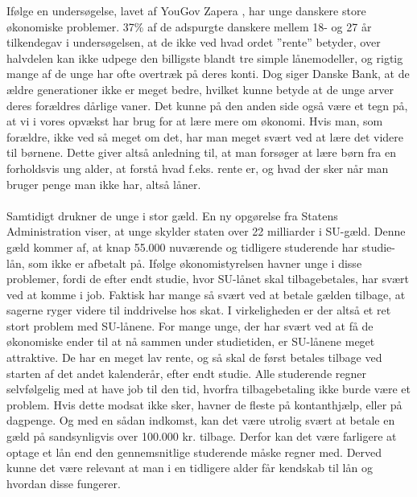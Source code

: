  Ifølge en undersøgelse, lavet af YouGov Zapera \cite{DanskeB1}, har unge danskere store økonomiske problemer. 37\% af de adspurgte danskere mellem 18- og 27 år tilkendegav i undersøgelsen, at de ikke ved hvad ordet ”rente” betyder, over halvdelen kan ikke udpege den billigste blandt tre simple lånemodeller, og rigtig mange af de unge har ofte overtræk på deres konti. Dog siger Danske Bank, at de ældre generationer ikke er meget bedre, hvilket kunne betyde at de unge arver deres forældres dårlige vaner. Det kunne på den anden side også være et tegn på, at vi i vores opvækst har brug for at lære mere om økonomi. Hvis man, som forældre, ikke ved så meget om det, har man meget svært ved at lære det videre til børnene. Dette giver altså anledning til, at man forsøger at lære børn fra en forholdsvis ung alder, at forstå hvad f.eks. rente er, og hvad der sker når man bruger penge man ikke har, altså låner.    \\
\\
Samtidigt drukner de unge i stor gæld. En ny opgørelse fra Statens Administration viser, at unge skylder staten over 22 milliarder i SU-gæld. Denne gæld kommer af, at knap 55.000 \cite{dr.dk} nuværende og tidligere studerende har studie-lån, som ikke er afbetalt på. Ifølge økonomistyrelsen havner unge i disse problemer, fordi de efter endt studie, hvor SU-lånet skal tilbagebetales, har svært ved at komme i job\cite{jobindex}. Faktisk har mange så svært ved at betale gælden tilbage, at sagerne ryger videre til inddrivelse hos skat\cite{BusinessDK1}. I virkeligheden er der altså et ret stort problem med SU-lånene. For mange unge, der har svært ved at få de økonomiske ender til at nå sammen under studietiden, er SU-lånene meget attraktive. De har en meget lav rente, og så skal de først betales tilbage ved starten af det andet kalenderår, efter endt studie. Alle studerende regner selvfølgelig med at have job til den tid, hvorfra tilbagebetaling ikke burde være et problem. Hvis dette modsat ikke sker, havner de fleste på kontanthjælp, eller på dagpenge. Og med en sådan indkomst, kan det være utrolig svært at betale en gæld på sandsynligvis over 100.000 kr. tilbage. Derfor kan det være farligere at optage et lån end den gennemsnitlige studerende måske regner med. Derved kunne det være relevant at man i en tidligere alder får kendskab til lån og hvordan disse fungerer.  \\
\\
